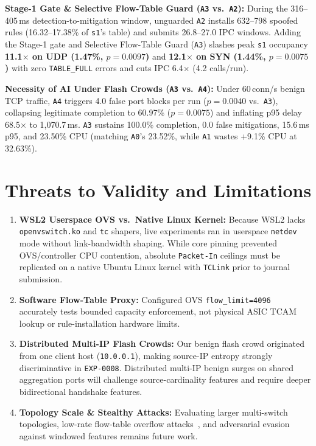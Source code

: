 \documentclass[conference]{IEEEtran}
\begin{document}
\textbf{Stage-1 Gate \& Selective Flow-Table Guard (\texttt{A3} vs.\ \texttt{A2}):} During the 316--405\,ms detection-to-mitigation window, unguarded \texttt{A2} installs 632--798 spoofed rules (16.32--17.38\% of \texttt{s1}'s table) and submits 26.8--27.0 IPC windows. Adding the Stage-1 gate and Selective Flow-Table Guard (\texttt{A3}) slashes peak \texttt{s1} occupancy \textbf{11.1$\times$ on UDP (1.47\%, $p=0.0097$)} and \textbf{12.1$\times$ on SYN (1.44\%, $p=0.0075$)} with zero \texttt{TABLE\_FULL} errors and cuts IPC 6.4$\times$ (4.2 calls/run).

\textbf{Necessity of AI Under Flash Crowds (\texttt{A3} vs.\ \texttt{A4}):} Under 60\,conn/s benign TCP traffic, \texttt{A4} triggers 4.0 false port blocks per run ($p=0.0040$ vs.\ \texttt{A3}), collapsing legitimate completion to 60.97\% ($p=0.0075$) and inflating p95 delay 68.5$\times$ to 1,070.7\,ms. \texttt{A3} sustains 100.0\% completion, 0.0 false mitigations, 15.6\,ms p95, and 23.50\% CPU (matching \texttt{A0}'s 23.52\%, while \texttt{A1} wastes +9.1\% CPU at 32.63\%).

\section{Threats to Validity and Limitations}
\begin{enumerate}
    \item \textbf{WSL2 Userspace OVS vs.\ Native Linux Kernel:} Because WSL2 lacks \texttt{openvswitch.ko} and \texttt{tc} shapers, live experiments ran in userspace \texttt{netdev} mode without link-bandwidth shaping. While core pinning prevented OVS/controller CPU contention, absolute \texttt{Packet-In} ceilings must be replicated on a native Ubuntu Linux kernel with \texttt{TCLink} prior to journal submission.
    \item \textbf{Software Flow-Table Proxy:} Configured OVS \texttt{flow\_limit=4096} accurately tests bounded capacity enforcement, not physical ASIC TCAM lookup or rule-installation hardware limits.
    \item \textbf{Distributed Multi-IP Flash Crowds:} Our benign flash crowd originated from one client host (\texttt{10.0.0.1}), making source-IP entropy strongly discriminative in \texttt{EXP-0008}. Distributed multi-IP benign surges on shared aggregation ports will challenge source-cardinality features and require deeper bidirectional handshake features.
    \item \textbf{Topology Scale \& Stealthy Attacks:} Evaluating larger multi-switch topologies, low-rate flow-table overflow attacks~\cite{tang2023ftmaster,mudgal2024flora}, and adversarial evasion against windowed features remains future work.
\end{enumerate}
\end{document}
